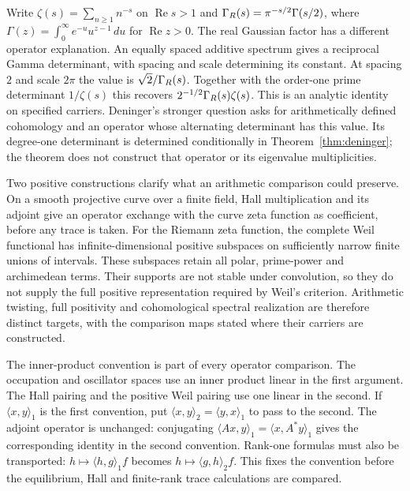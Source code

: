 Write $\zeta(s)=\sum_{n\ge1}n^{-s}$ on $\operatorname{Re}s>1$
and $\Gamma_{R}(s)=\pi^{-s/2}\Gamma(s/2)$, where
$\Gamma(z)=\int_0^\infty e^{-u}u^{z-1}\,du$ for $\operatorname{Re}z>0$.
The real Gaussian factor has a different operator explanation.
An equally spaced additive spectrum gives a reciprocal Gamma
determinant, with spacing and scale determining its constant. At
spacing $2$ and scale $2\pi$ the value is $\sqrt2/\Gamma_{R}(s)$.
Together with the order-one prime determinant $1/\zeta(s)$ this
recovers $2^{-1/2}\Gamma_{R}(s)\zeta(s)$. This is an analytic identity
on specified carriers. Deninger's stronger question asks for
arithmetically defined cohomology and an operator whose alternating
determinant has this value. Its degree-one determinant is determined
conditionally in Theorem~\ref{thm:deninger}; the theorem does not
construct that operator or its eigenvalue multiplicities.

Two positive constructions clarify what an arithmetic comparison
could preserve. On a smooth projective curve over a finite field,
Hall multiplication and its adjoint give an operator exchange with
the curve zeta function as coefficient, before any trace is taken.
For the Riemann zeta function, the complete Weil functional has
infinite-dimensional positive subspaces on sufficiently narrow finite
unions of intervals. These subspaces retain all polar, prime-power
and archimedean terms. Their supports are not stable under convolution,
so they do not supply the full positive representation required by
Weil's criterion. Arithmetic twisting, full positivity and
cohomological spectral realization are therefore distinct targets,
with the comparison maps stated where their carriers are constructed.

The inner-product convention is part of every operator comparison.
The occupation and oscillator spaces use an inner product linear in
the first argument. The Hall pairing and the positive Weil pairing use
one linear in the second.
If $\langle x,y\rangle_1$ is the first convention, put
$\langle x,y\rangle_2=\langle y,x\rangle_1$ to pass to the second.
The adjoint operator is unchanged: conjugating
$\langle Ax,y\rangle_1=\langle x,A^*y\rangle_1$ gives the
corresponding identity in the second convention. Rank-one formulas
must also be transported: $h\mapsto\langle h,g\rangle_1 f$ becomes
$h\mapsto\langle g,h\rangle_2 f$. This fixes the convention before
the equilibrium, Hall and finite-rank trace calculations are compared.
